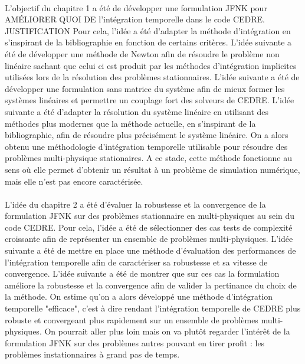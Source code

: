     \paragraph{}
    L'objectif du chapitre 1 a été de développer une formulation JFNK pour AMÉLIORER QUOI DE l'intégration temporelle dans le code CEDRE.
    JUSTIFICATION
    Pour cela, l'idée a été d'adapter la méthode d'intégration en s'inspirant de la bibliographie en fonction de certains critères.
    L'idée suivante a été de développer une méthode de Newton afin de résoudre le problème non linéaire sachant que celui ci est produit par les méthodes d'intégration implicites utilisées lors de la résolution des problèmes stationnaires.
    L'idée suivante a été de développer une formulation sans matrice du système afin de mieux former les systèmes linéaires et permettre un couplage fort des solveurs de CEDRE.
    L'idée suivante a été d'adapter la résolution du système linéaire en utilisant des méthodes plus modernes que la méthode actuelle, en s'inspirant de la bibliographie, afin de résoudre plus précisément le système linéaire.
    On a alors obtenu une méthodologie d'intégration temporelle utilisable pour résoudre des problèmes multi-physique stationaires.
    A ce stade, cette méthode fonctionne au sens où elle permet d'obtenir un résultat à un problème de simulation numérique, mais elle n'est pas encore caractérisée.

    \paragraph{}
    L'idée du chapitre 2 a été d'évaluer la robustesse et la convergence de la formulation JFNK sur des problèmes stationnaire en multi-physiques au sein du code CEDRE.
    Pour cela, l'idée a été de sélectionner des cas tests de complexité croissante afin de représenter un ensemble de problèmes multi-physiques.
    L'idée suivante a été de mettre en place une méthode d'évaluation des performances de l'intégration temporelle afin de caractériser sa robustesse et sa vitesse de convergence.
    L'idée suivante a été de montrer que sur ces cas la formulation améliore la robustesse et la convergence afin de valider la pertinance du choix de la méthode.
    On estime qu'on a alors développé une méthode d'intégration temporelle "efficace", c'est à dire rendant l'intégration temporelle de CEDRE plus robuste et convergeant plus rapidement sur un ensemble de problèmes multi-physiques.
    On pourrait aller plus loin mais on va plutôt regarder l'intérêt de la formulation JFNK sur des problèmes autres pouvant en tirer profit : les problèmes instationnaires à grand pas de temps.

